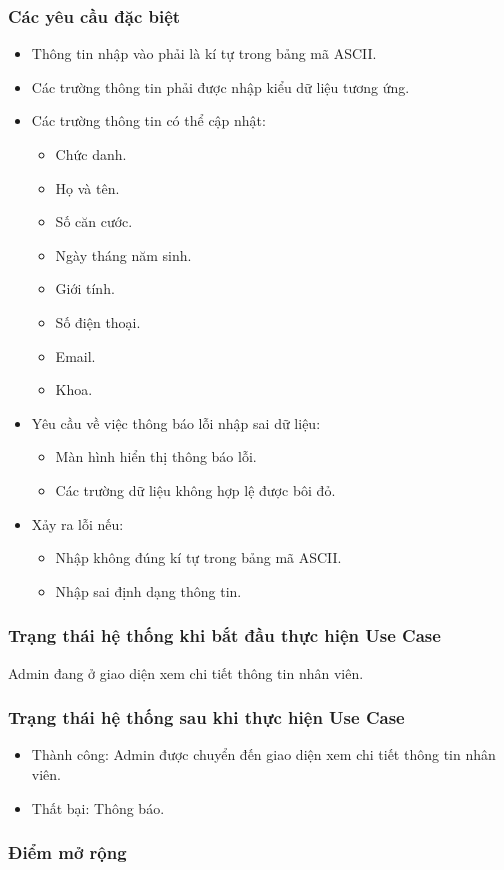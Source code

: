 \subsubsection{Các yêu cầu đặc biệt}
\begin{itemize}
  \item Thông tin nhập vào phải là kí tự trong bảng mã ASCII.
  \item Các trường thông tin phải được nhập kiểu dữ liệu tương ứng.
  \item Các trường thông tin có thể cập nhật:
    \begin{itemize}
      \item Chức danh.
      \item Họ và tên.
      \item Số căn cước.
      \item Ngày tháng năm sinh.
      \item Giới tính.
      \item Số điện thoại.
      \item Email.
      \item Khoa.
    \end{itemize}
  \item Yêu cầu về việc thông báo lỗi nhập sai dữ liệu:
    \begin{itemize}
      \item Màn hình hiển thị thông báo lỗi.
      \item Các trường dữ liệu không hợp lệ được bôi đỏ.
    \end{itemize}
  \item Xảy ra lỗi nếu:
    \begin{itemize}
      \item Nhập không đúng kí tự trong bảng mã ASCII.
      \item Nhập sai định dạng thông tin.
    \end{itemize}
\end{itemize}

\subsubsection{Trạng thái hệ thống khi bắt đầu thực hiện Use Case}
Admin đang ở giao diện xem chi tiết thông tin nhân viên.

\subsubsection{Trạng thái hệ thống sau khi thực hiện Use Case}
\begin{itemize}
  \item Thành công: Admin được chuyển đến giao diện xem chi tiết thông tin nhân viên.
  \item Thất bại: Thông báo.
\end{itemize}

\subsubsection{Điểm mở rộng}